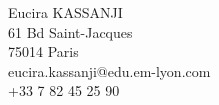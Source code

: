 
Eucira KASSANJI \\
61 Bd Saint-Jacques \\
75014 Paris \\
eucira.kassanji@edu.em-lyon.com \\
+33 7 82 45 25 90 \\

